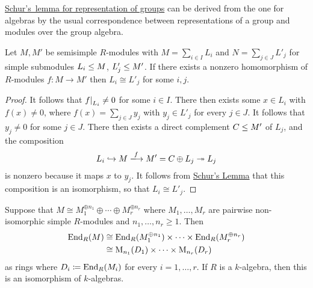 \begin{remark}
  \hyperref[proposition: Schurs lemma representations]{Schur’s~lemma for representation of groups} can be derived from the one for algebras by the usual correspondence between representations of a group and modules over the group algebra.
\end{remark}


\begin{corollary}
  \label{corollary: no nonzero homomorphisms between disjoint semisimple modules}
  Let $M, M'$ be semisimple $R$-modules with $M = \sum_{i \in I} L_i$ and $N = \sum_{j \in J} L'_j$ for simple submodules $L_i \leq M$, $L'_j \leq M'$.
  If there exists a nonzero homomorphism of $R$-modules $f \colon M \to M'$ then $L_i \cong L'_j$ for some $i, j$.
\end{corollary}


\begin{proof}
  It follows that $\restrict{f}{L_i} \neq 0$ for some $i \in I$.
  There then exists some $x \in L_i$ with $f(x) \neq 0$, where $f(x) = \sum_{j \in J} y_j$ with $y_j \in L'_j$ for every $j \in J$.
  It follows that $y_j \neq 0$ for some $j \in J$.
  There then exists a direct complement $C \leq M'$ of $L_j$, and the composition
  \[
                        L_i
    \inclusion          M
    \xlongrightarrow{f} M'
    =                   C \oplus L_j
    \projection         L_j
  \]
  is nonzero because it maps $x$ to $y_j$.
  It follows from \hyperref[proposition: schurs lemma for modules]{Schur’s Lemma} that this composition is an isomorphism, so that $L_i \cong L'_j$.
\end{proof}


\begin{corollary}
  \label{corollary: End is isomorphic to product of matrix rings Schur style}
  Suppose that $M \cong M_1^{\oplus n_1} \oplus \dotsb \oplus M_r^{\oplus n_r}$ where $M_1, \dotsc, M_r$ are pairwise non-isomorphic simple $R$-modules and $n_1, \dotsc, n_r \geq 1$.
  Then
  \begin{align*}
            \operatorname{End}_R(M)
    &\cong  \operatorname{End}_R(M_1^{\oplus n_1}) \times \dotsb \times \operatorname{End}_R(M_r^{\oplus n_r})  \\
    &\cong  \operatorname{M}_{n_1}(D_1) \times \dotsb \times \operatorname{M}_{n_r}(D_r)
  \end{align*}
  as rings where $D_i \coloneqq \operatorname{End}_R(M_i)$ for every $i = 1, \dotsc, r$.
  If $R$ is a $k$-algebra, then this is an isomorphism of $k$-algebras.
\end{corollary}


